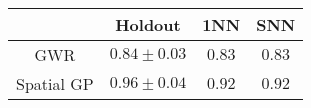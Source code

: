 \begin{tabular}{c|ccc} 
    & Holdout & 1NN & SNN \\ \hline 
GWR & $\mathbf{0.84 \pm 0.03}$ & $\mathbf{0.83}$ & $\mathbf{0.83}$ \\ 
Spatial GP & $0.96 \pm 0.04$ & $0.92$ & $0.92$ \\ 
\end{tabular}